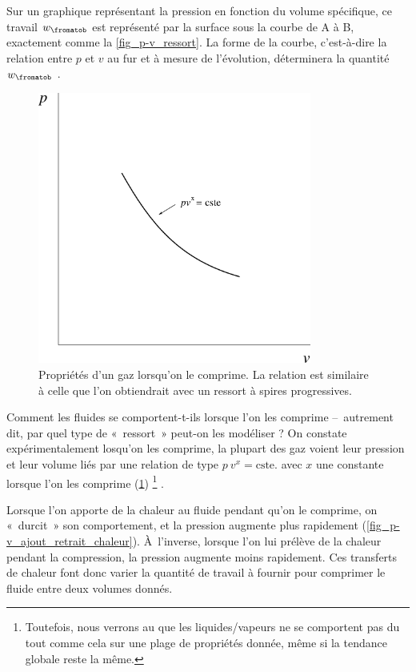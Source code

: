 		Sur un graphique représentant la pression en fonction du volume spécifique, ce travail $w_\fromatob$ est représenté par la surface sous la courbe de A à B, exactement comme la \cref{fig_p-v_ressort}. La forme de la courbe, c’est-à-dire la relation entre $p$ et $v$ au fur et à mesure de l’évolution, déterminera la quantité $w_\fromatob$ .

		\begin{figure}
			\begin{center}
			\includegraphics[width=9cm]{images/pv_gaz_simple.png}
			\end{center}
			\caption{Propriétés d’un gaz lorsqu’on le comprime. La relation est similaire à celle que l’on obtiendrait avec un ressort à spires progressives.}
			\label{fig_p-v_pvx}
		\end{figure}

		Comment les fluides se comportent-t-ils lorsque l’on les comprime --\ autrement dit, par quel type de «~ressort~» peut-on les modéliser ? On constate expérimentalement losqu’on les comprime, la plupart des gaz voient leur pression et leur volume liés par une relation de type $p\ v^{x} = \text{cste.}$ avec $x$ une constante lorsque l’on les comprime (\cref{fig_p-v_pvx})%
			\footnote{Toutefois, nous verrons au \courscinqshort que les liquides/vapeurs ne se comportent pas du tout comme cela sur une plage de propriétés donnée, même si la tendance globale reste la même.}%
		.

		Lorsque l’on apporte de la chaleur au fluide pendant qu’on le comprime, on «~durcit~» son comportement, et la pression augmente plus rapidement (\cref{fig_p-v_ajout_retrait_chaleur}). À~l’inverse, lorsque l’on lui prélève de la chaleur pendant la compression, la pression augmente moins rapidement. Ces transferts de chaleur font donc varier la quantité de travail à fournir pour comprimer le fluide entre deux volumes donnés.
		
